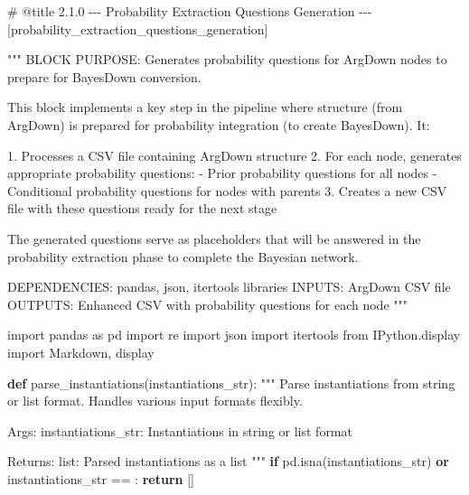 \documentclass[
  11pt,
  letterpaper,
]{book}
\newenvironment{Shaded}{\begin{snugshade}}{\end{snugshade}}
\newcommand{\CommentTok}[1]{\textcolor[rgb]{0.37,0.37,0.37}{#1}}
\newcommand{\ControlFlowTok}[1]{\textcolor[rgb]{0.00,0.23,0.31}{\textbf{#1}}}
\newcommand{\ImportTok}[1]{\textcolor[rgb]{0.00,0.46,0.62}{#1}}
\newcommand{\KeywordTok}[1]{\textcolor[rgb]{0.00,0.23,0.31}{\textbf{#1}}}
\newcommand{\NormalTok}[1]{\textcolor[rgb]{0.00,0.23,0.31}{#1}}
\newcommand{\OperatorTok}[1]{\textcolor[rgb]{0.37,0.37,0.37}{#1}}
\newcommand{\StringTok}[1]{\textcolor[rgb]{0.13,0.47,0.30}{#1}}
\begin{document}
\label{probability_extraction_questions_generation}
\begin{Shaded}
\begin{Highlighting}[]
\CommentTok{\# @title 2.1.0 {-}{-}{-} Probability Extraction Questions Generation {-}{-}{-} [probability\_extraction\_questions\_generation]}

\CommentTok{"""}
\CommentTok{BLOCK PURPOSE: Generates probability questions for ArgDown nodes to prepare for BayesDown conversion.}

\CommentTok{This block implements a key step in the pipeline where structure (from ArgDown)}
\CommentTok{is prepared for probability integration (to create BayesDown). It:}

\CommentTok{1. Processes a CSV file containing ArgDown structure}
\CommentTok{2. For each node, generates appropriate probability questions:}
\CommentTok{   {-} Prior probability questions for all nodes}
\CommentTok{   {-} Conditional probability questions for nodes with parents}
\CommentTok{3. Creates a new CSV file with these questions ready for the next stage}

\CommentTok{The generated questions serve as placeholders that will be answered in the}
\CommentTok{probability extraction phase to complete the Bayesian network.}

\CommentTok{DEPENDENCIES: pandas, json, itertools libraries}
\CommentTok{INPUTS: ArgDown CSV file}
\CommentTok{OUTPUTS: Enhanced CSV with probability questions for each node}
\CommentTok{"""}

\ImportTok{import}\NormalTok{ pandas }\ImportTok{as}\NormalTok{ pd}
\ImportTok{import}\NormalTok{ re}
\ImportTok{import}\NormalTok{ json}
\ImportTok{import}\NormalTok{ itertools}
\ImportTok{from}\NormalTok{ IPython.display }\ImportTok{import}\NormalTok{ Markdown, display}


\KeywordTok{def}\NormalTok{ parse\_instantiations(instantiations\_str):}
    \CommentTok{"""}
\CommentTok{    Parse instantiations from string or list format.}
\CommentTok{    Handles various input formats flexibly.}

\CommentTok{    Args:}
\CommentTok{        instantiations\_str: Instantiations in string or list format}

\CommentTok{    Returns:}
\CommentTok{        list: Parsed instantiations as a list}
\CommentTok{    """}
    \ControlFlowTok{if}\NormalTok{ pd.isna(instantiations\_str) }\KeywordTok{or}\NormalTok{ instantiations\_str }\OperatorTok{==} \StringTok{\textquotesingle{}\textquotesingle{}}\NormalTok{:}
        \ControlFlowTok{return}\NormalTok{ []}


\end{Highlighting}
\end{Shaded}
\end{document}
